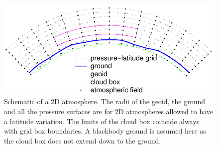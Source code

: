 \begin{figure}[!t]
 \begin{center}
  \includegraphics*[width=0.95\hsize]{Figs/fm_definitions/atm_dim_2d}
  \caption{ Schematic of a 2D atmosphere. The radii of the geoid, the ground
    and all the pressure surfaces are for 2D atmospheres allowed to
    have a latitude variation. The limits of the cloud box coincide
    always with grid box boundaries. A blackbody ground is assumed
    here as the cloud box does not extend down to the ground. }
  \label{fig:fm_defs:2d}
 \end{center}
\end{figure}


\label{sec:fm_defs:altitudes}

